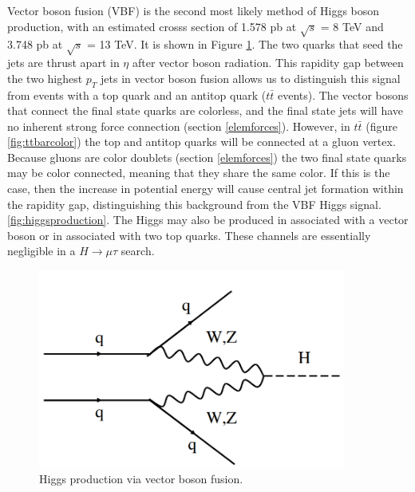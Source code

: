 \documentclass[oneside, letterpaper, oldfontcommands]{memoir}
\begin{document}
\qquad Vector boson fusion (VBF) is the second most likely method of Higgs boson production, with an estimated crosss section of 1.578 pb at $\sqrt{s}$ = 8 TeV and 3.748 pb at $\sqrt{s}$ = 13 TeV.
It is shown in Figure \ref{fig:vbfHiggs}. The two quarks that seed the jets are thrust apart in $\eta$ after vector boson radiation. This rapidity gap between the two highest $p_{T}$ jets in vector boson fusion allows us to distinguish this signal from events with a top quark and an antitop quark ($t\bar{t}$ events). The vector bosons that connect the final state quarks are colorless, and the final state jets will have no inherent strong force connection (section \ref{elemforces}). However, in $t\bar{t}$ (figure \ref{fig:ttbarcolor}) the top and antitop quarks will be connected at a gluon vertex. Because gluons are color doublets (section \ref{elemforces}) the two final state quarks may be color connected, meaning that they share the same color. If this is the case, then the increase in potential energy will cause central jet formation within the rapidity gap, distinguishing this background from the VBF Higgs signal. \ref{fig:higgsproduction}\cite{Dittmaier:2011ti}. The Higgs may also be produced in associated with a vector boson or in associated with two top quarks. These channels are essentially negligible in a $H \rightarrow \mu\tau$ search.

\begin{figure}[here]
\includegraphics[width=0.9\textwidth]{vbfHiggs.png}
\caption{Higgs production via vector boson fusion.}
\label{fig:vbfHiggs}
\end{figure}
\end{document}
